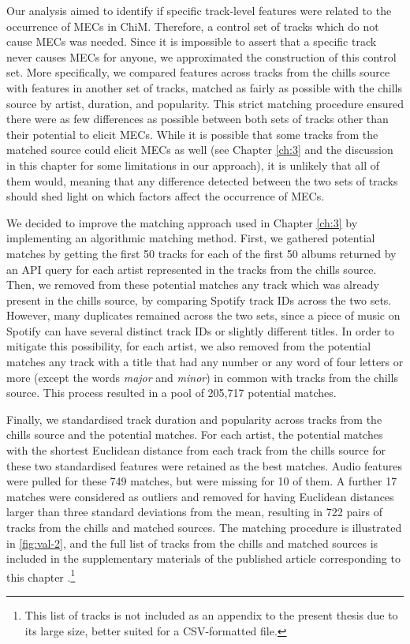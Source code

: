 Our analysis aimed to identify if specific track-level features were related to the occurrence of MECs in ChiM. Therefore, a control set of tracks which do not cause MECs was needed. Since it is impossible to assert that a specific track never causes MECs for anyone, we approximated the construction of this control set. More specifically, we compared features across tracks from the chills source with features in another set of tracks, matched as fairly as possible with the chills source by artist, duration, and popularity. This strict matching procedure ensured there were as few differences as possible between both sets of tracks other than their potential to elicit MECs. While it is possible that some tracks from the matched source could elicit MECs as well (see Chapter \ref{ch:3} and the discussion in this chapter for some limitations in our approach), it is unlikely that all of them would, meaning that any difference detected between the two sets of tracks should shed light on which factors affect the occurrence of MECs. 

We decided to improve the matching approach used in Chapter \ref{ch:3} by implementing an algorithmic matching method. First, we gathered potential matches by getting the first 50 tracks for each of the first 50 albums returned by an API query for each artist represented in the tracks from the chills source. Then, we removed from these potential matches any track which was already present in the chills source, by comparing Spotify track IDs across the two sets. However, many duplicates remained across the two sets, since a piece of music on Spotify can have several distinct track IDs or slightly different titles. In order to mitigate this possibility, for each artist, we also removed from the potential matches any track with a title that had any number or any word of four letters or more (except the words \emph{major} and \emph{minor}) in common with tracks from the chills source. This process resulted in a pool of 205,717 potential matches.

Finally, we standardised track duration and popularity across tracks from the chills source and the potential matches. For each artist, the potential matches with the shortest Euclidean distance from each track from the chills source for these two standardised features were retained as the best matches. Audio features were pulled for these 749 matches, but were missing for 10 of them. A further 17 matches were considered as outliers and removed for having Euclidean distances larger than three standard deviations from the mean, resulting in 722 pairs of tracks from the chills and matched sources. The matching procedure is illustrated in \autoref{fig:val-2}, and the full list of tracks from the chills and matched sources is included in the supplementary materials of the published article corresponding to this chapter \parencite{defleurian2021a}.\footnote{This list of tracks is not included as an appendix to the present thesis due to its large size, better suited for a CSV-formatted file.}

